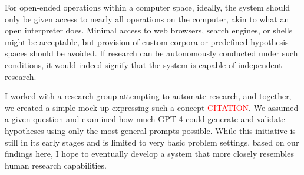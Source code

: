 For open-ended operations within a computer space, ideally, the system should only be given access to nearly all operations on the computer, akin to what an open interpreter does. Minimal access to web browsers, search engines, or shells might be acceptable, but provision of custom corpora or predefined hypothesis spaces should be avoided. If research can be autonomously conducted under such conditions, it would indeed signify that the system is capable of independent research.

I worked with a research group attempting to automate research, and together, we created a simple mock-up expressing such a concept \textcolor{red}{CITATION}. We assumed a given question and examined how much GPT-4 could generate and validate hypotheses using only the most general prompts possible. While this initiative is still in its early stages and is limited to very basic problem settings, based on our findings here, I hope to eventually develop a system that more closely resembles human research capabilities.




